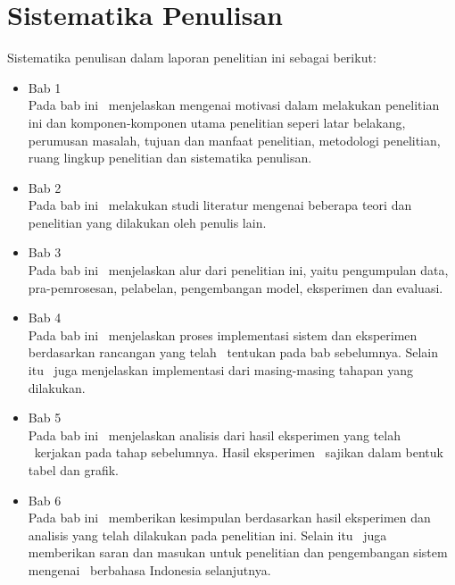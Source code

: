 \section{Sistematika Penulisan}
Sistematika penulisan dalam laporan penelitian ini sebagai berikut:
\begin{itemize}

	\item Bab 1 \babSatu \\
	Pada bab ini \saya~menjelaskan mengenai motivasi dalam melakukan penelitian ini dan komponen-komponen utama penelitian seperi latar belakang, perumusan masalah, tujuan dan manfaat penelitian, metodologi penelitian, ruang lingkup penelitian dan sistematika penulisan.
	
	\item Bab 2 \babDua \\
	Pada bab ini \saya~melakukan studi literatur mengenai beberapa teori dan penelitian yang dilakukan oleh penulis lain. 
		
	\item Bab 3 \babTiga \\
	Pada bab ini \saya~menjelaskan alur dari penelitian ini, yaitu pengumpulan data, pra-pemrosesan, pelabelan, pengembangan model, eksperimen dan evaluasi.
		
	\item Bab 4 \babEmpat \\
	Pada bab ini \saya~menjelaskan proses implementasi sistem dan eksperimen berdasarkan rancangan yang telah \penulis~tentukan pada bab sebelumnya. Selain itu \saya~juga menjelaskan implementasi dari masing-masing tahapan yang dilakukan.
		
	\item Bab 5 \babLima \\
	Pada bab ini \saya~menjelaskan analisis dari hasil eksperimen yang telah \saya~kerjakan pada tahap sebelumnya. Hasil eksperimen \saya~sajikan dalam bentuk tabel dan grafik.
	
	\item Bab 6 \babEnam \\
	Pada bab ini \saya~memberikan kesimpulan berdasarkan hasil eksperimen dan analisis yang telah dilakukan pada penelitian ini. Selain itu \saya~juga memberikan saran dan masukan untuk penelitian dan pengembangan sistem mengenai \mer~berbahasa Indonesia selanjutnya.
	
\end{itemize}